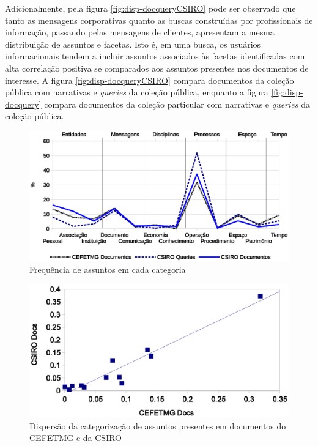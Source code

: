 Adicionalmente, pela figura \ref{fig:disp-docqueryCSIRO} pode ser observado que tanto as mensagens corporativas quanto as buscas construídas por profissionais de informação, passando pelas mensagens de clientes, apresentam a mesma distribuição de assuntos e facetas. Isto é, em uma busca, os usuários informacionais tendem a incluir assuntos associados às facetas identificadas com alta correlação positiva se comparados aos assuntos presentes nos documentos de interesse. A figura \ref{fig:disp-docqueryCSIRO} compara documentos da coleção pública com narrativas e \textit{queries} da coleção pública, enquanto a figura \ref{fig:disp-docquery} compara documentos da coleção particular com narrativas e \textit{queries} da coleção pública.





\begin{figure}
	\caption{\label{fig:facetasDocsQueries}Frequência de assuntos em cada categoria}

	\centering
		\includegraphics[width=1.0\textwidth]{fig/subjects-pt-docsqueries.eps}

\end{figure}







\begin{figure}
	\caption{\label{fig:disp-docdoc}Dispersão da categorização de assuntos presentes em documentos do CEFETMG e da CSIRO}

	\centering
		\includegraphics[width=1.0\textwidth]{fig/disp-docdoc.eps}

\end{figure}







